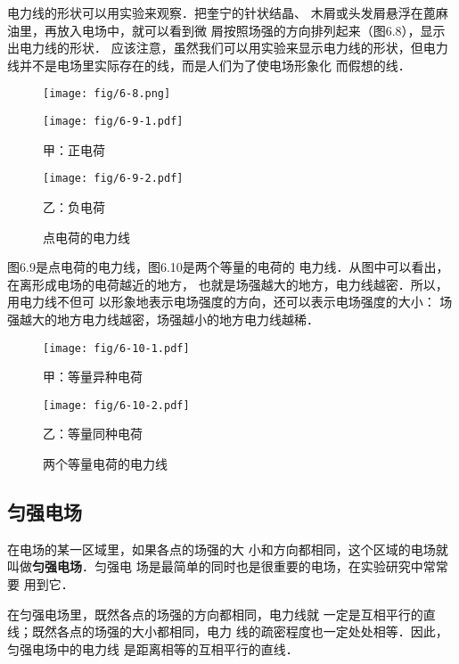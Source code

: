 电力线的形状可以用实验来观察．把奎宁的针状结晶、
木屑或头发屑悬浮在蓖麻油里，再放入电场中，就可以看到微
屑按照场强的方向排列起来（图6.8），显示出电力线的形状．
应该注意，虽然我们可以用实验来显示电力线的形状，但电力
线并不是电场里实际存在的线，而是人们为了使电场形象化
而假想的线．
\begin{figure}[htp]\centering
	\texttt{[image: fig/6-8.png]}
	\caption{}
	\end{figure}

\begin{figure}[htp]
	\centering
	\begin{minipage}[t]{0.48\textwidth}
	\centering
	\texttt{[image: fig/6-9-1.pdf]}
	\caption*{甲：正电荷}
	\end{minipage}
	\begin{minipage}[t]{0.48\textwidth}
	\centering
	\texttt{[image: fig/6-9-2.pdf]}
	\caption*{乙：负电荷}
	\end{minipage}
	\caption{点电荷的电力线}
	\end{figure}
	
图6.9是点电荷的电力线，图6.10是两个等量的电荷的
电力线．从图中可以看出，在离形成电场的电荷越近的地方，
也就是场强越大的地方，电力线越密．所以，用电力线不但可
以形象地表示电场强度的方向，还可以表示电场强度的大小：
场强越大的地方电力线越密，场强越小的地方电力线越稀．
\begin{figure}[htp]
	\centering
	\begin{minipage}[t]{0.48\textwidth}
	\centering
	\texttt{[image: fig/6-10-1.pdf]}
	\caption*{甲：等量异种电荷}
	\end{minipage}
	\begin{minipage}[t]{0.48\textwidth}
	\centering
	\texttt{[image: fig/6-10-2.pdf]}
	\caption*{乙：等量同种电荷}
	\end{minipage}
	\caption{两个等量电荷的电力线}
	\end{figure}
	


\subsection{匀强电场} 

在电场的某一区域里，如果各点的场强的大
小和方向都相同，这个区域的电场就叫做\textbf{匀强电场}．匀强电
场是最简单的同时也是很重要的电场，在实验研究中常常要
用到它．

在匀强电场里，既然各点的场强的方向都相同，电力线就
一定是互相平行的直线；既然各点的场强的大小都相同，电力
线的疏密程度也一定处处相等．因此，匀强电场中的电力线
是距离相等的互相平行的直线．

